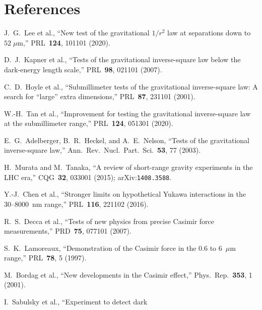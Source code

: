 \documentclass[11pt,a4paper]{article}
\begin{document}
\section*{References}

\begin{enumerate}[label={[\arabic*]}, leftmargin=2em]
  \item\label{ref:lee2020} J.~G.~Lee et al., ``New test of the gravitational
    $1/r^2$ law at separations down to $52\;\mu$m,''
    PRL~\textbf{124}, 101101 (2020).
  \item\label{ref:kapner2007} D.~J.~Kapner et al., ``Tests of the gravitational
    inverse-square law below the dark-energy length scale,''
    PRL~\textbf{98}, 021101 (2007).
  \item\label{ref:hoyle2001} C.~D.~Hoyle et al., ``Submillimeter tests of the
    gravitational inverse-square law: A search for ``large'' extra dimensions,''
    PRL~\textbf{87}, 231101 (2001).
  \item\label{ref:tan2020} W.-H.~Tan et al., ``Improvement for testing the
    gravitational inverse-square law at the submillimeter range,''
    PRL~\textbf{124}, 051301 (2020).
  \item\label{ref:adelberger2003} E.~G.~Adelberger, B.~R.~Heckel, and
    A.~E.~Nelson, ``Tests of the gravitational inverse-square law,''
    Ann.\ Rev.\ Nucl.\ Part.\ Sci.~\textbf{53}, 77 (2003).
  \item\label{ref:murata2015} H.~Murata and M.~Tanaka, ``A review of
    short-range gravity experiments in the LHC era,''
    CQG~\textbf{32}, 033001 (2015); arXiv:\texttt{1408.3588}.
  \item\label{ref:chen2016} Y.-J.~Chen et al., ``Stronger limits on
    hypothetical Yukawa interactions in the 30--8000~nm range,''
    PRL~\textbf{116}, 221102 (2016).
  \item\label{ref:decca2007} R.~S.~Decca et al., ``Tests of new physics from
    precise Casimir force measurements,'' PRD~\textbf{75}, 077101 (2007).
  \item\label{ref:lamoreaux1997} S.~K.~Lamoreaux, ``Demonstration of the
    Casimir force in the 0.6 to 6~$\mu$m range,'' PRL~\textbf{78}, 5 (1997).
  \item\label{ref:bordag2001} M.~Bordag et al., ``New developments in the
    Casimir effect,'' Phys.\ Rep.~\textbf{353}, 1 (2001).
  \item\label{ref:sabulsky2019} I.~Sabulsky et al., ``Experiment to detect dark

\end{enumerate}
\end{document}
